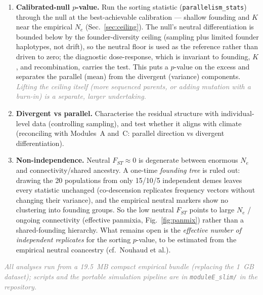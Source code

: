 \documentclass[11pt,a4paper]{article}
\newcommand{\wip}[1]{\textcolor{gray}{\textit{#1}}}
\begin{document}
\begin{enumerate}\itemsep2pt
\item \textbf{Calibrated-null $p$-value.} Run the sorting statistic
(\texttt{parallelism\_stats}) through the null at the best-achievable calibration
--- shallow founding and $K$ near the empirical $N_e$ (Sec.~\ref{sec:ceiling}). The
null's neutral differentiation is bounded below by the founder-diversity ceiling
(sampling plus limited founder haplotypes, not drift), so the neutral floor is used
as the reference rather than driven to zero; the diagnostic dose-response, which is
invariant to founding, $K$, and recombination, carries the test. This puts a
$p$-value on the excess and separates the parallel (mean) from the divergent
(variance) components. \wip{Lifting the ceiling itself (more sequenced parents, or
adding mutation with a burn-in) is a separate, larger undertaking.}
\item \textbf{Divergent vs parallel.} Characterise the residual structure with
individual-level data (controlling sampling), and test whether it aligns with
climate (reconciling with Modules~A and~C: parallel direction vs divergent
differentiation).
\item \textbf{Non-independence.} Neutral $F_{ST}\approx0$ is degenerate between
enormous $N_e$ and connectivity/shared ancestry. A one-time \emph{founding tree} is
ruled out: drawing the 20 populations from only 15/10/5 independent demes leaves every
statistic unchanged (co-descension replicates frequency vectors without changing their
variance), and the empirical neutral markers show no clustering into founding groups.
So the low neutral $F_{ST}$ points to large $N_e$ / ongoing connectivity (effective
panmixia, Fig.~\ref{fig:panmix}) rather than a shared-founding hierarchy. What remains
open is the \emph{effective number of independent replicates} for the sorting
$p$-value, to be estimated from the empirical neutral coancestry (cf.\ Nouhaud et al.).
\end{enumerate}

\noindent\wip{All analyses run from a 19.5~MB compact empirical bundle (replacing
the 1~GB dataset); scripts and the portable simulation pipeline are in
\texttt{moduleE\_slim/} in the repository.}
\end{document}
